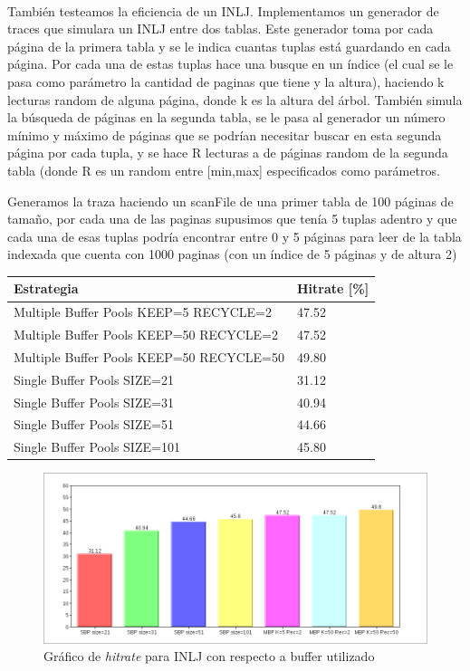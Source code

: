 \ \\

También testeamos la eficiencia de un INLJ. Implementamos un generador de traces que simulara un INLJ entre dos tablas.
Este generador toma por cada página de la primera tabla y se le indica cuantas tuplas está guardando en cada página. 
Por cada una de estas tuplas hace una busque en un índice (el cual se le pasa como  parámetro la cantidad de paginas
que tiene y la altura), haciendo k lecturas random de alguna página, donde k es la altura del árbol. También simula
la búsqueda de páginas en la segunda tabla, se le pasa al generador un número mínimo y máximo de páginas que se 
podrían necesitar buscar en esta segunda página por cada tupla, y se hace R lecturas a de páginas random de la
segunda tabla (donde R es un random entre [min,max] especificados como parámetros.



Generamos la traza haciendo un scanFile de una primer tabla de 100 páginas de tama\~{n}o, por cada una de las paginas
supusimos que tenía 5 tuplas adentro y que cada una de esas tuplas podría encontrar entre 0 y 5 páginas
para leer de la tabla indexada que cuenta con 1000 paginas (con un índice de 5 páginas y de altura 2)

\begin{table}[H]
        \begin{tabular}{l||l}
    \large{\textbf{Estrategia}}                             & \large{\textbf{Hitrate}} [\%] \\
    \hline
                Multiple Buffer Pools KEEP=5 RECYCLE=2		&	47.52	\\
                Multiple Buffer Pools KEEP=50 RECYCLE=2		&	47.52	\\
                Multiple Buffer Pools KEEP=50 RECYCLE=50 	&	49.80	\\
                Single Buffer Pools SIZE=21             	&	31.12	\\
                Single Buffer Pools SIZE=31             	&	40.94	\\
                Single Buffer Pools SIZE=51             	&	44.66	\\
                Single Buffer Pools SIZE=101            	&	45.80	\\
                \end{tabular}
            \end{table}
\begin{figure}[H]\centering
    \includegraphics[scale=0.4]{INLJ.png}
    \caption{Gráfico de \textit{hitrate} para INLJ con respecto a buffer utilizado}
    \label{grafiquito3}
\end{figure}

